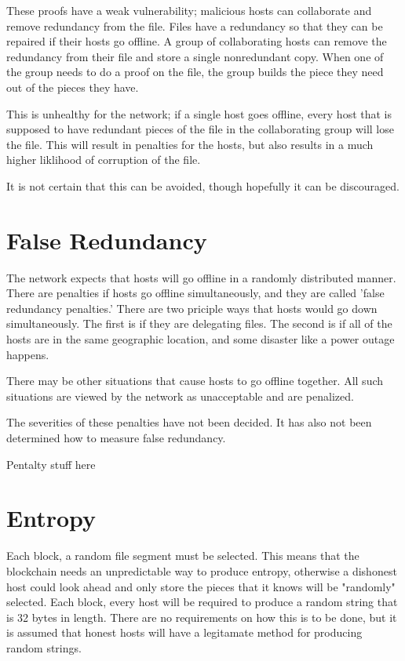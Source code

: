 \documentclass[twocolumn]{article}
\begin{document}
These proofs have a weak vulnerability; malicious hosts can collaborate and remove redundancy from the file.
Files have a redundancy so that they can be repaired if their hosts go offline.
A group of collaborating hosts can remove the redundancy from their file and store a single nonredundant copy.
When one of the group needs to do a proof on the file, the group builds the piece they need out of the pieces they have.

This is unhealthy for the network; if a single host goes offline, every host that is supposed to have redundant pieces of the file in the collaborating group will lose the file.
This will result in penalties for the hosts, but also results in a much higher liklihood of corruption of the file.

It is not certain that this can be avoided, though hopefully it can be discouraged.

\section{False Redundancy}

The network expects that hosts will go offline in a randomly distributed manner.
There are penalties if hosts go offline simultaneously, and they are called 'false redundancy penalties.'
There are two priciple ways that hosts would go down simultaneously.
The first is if they are delegating files.
The second is if all of the hosts are in the same geographic location, and some disaster like a power outage happens.

There may be other situations that cause hosts to go offline together.
All such situations are viewed by the network as unacceptable and are penalized.

The severities of these penalties have not been decided.
It has also not been determined how to measure false redundancy.

\begin{center}
Pentalty stuff here
\end{center}

\section{Entropy}

Each block, a random file segment must be selected.
This means that the blockchain needs an unpredictable way to produce entropy, otherwise a dishonest host could look ahead and only store the pieces that it knows will be "randomly" selected.
Each block, every host will be required to produce a random string that is 32 bytes in length.
There are no requirements on how this is to be done, but it is assumed that honest hosts will have a legitamate method for producing random strings.
\end{document}

